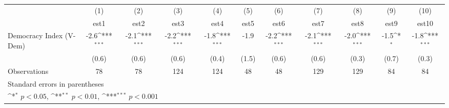 {
\def\sym#1{\ifmmode^{#1}\else\(^{#1}\)\fi}
\begin{tabular}{l*{10}{c}}
\hline\hline
                    &\multicolumn{1}{c}{(1)}         &\multicolumn{1}{c}{(2)}         &\multicolumn{1}{c}{(3)}         &\multicolumn{1}{c}{(4)}         &\multicolumn{1}{c}{(5)}         &\multicolumn{1}{c}{(6)}         &\multicolumn{1}{c}{(7)}         &\multicolumn{1}{c}{(8)}         &\multicolumn{1}{c}{(9)}         &\multicolumn{1}{c}{(10)}         \\
                    &        est1         &        est2         &        est3         &        est4         &        est5         &        est6         &        est7         &        est8         &        est9         &       est10         \\
\hline
Democracy Index (V-Dem)&        -2.6\sym{***}&        -2.1\sym{***}&        -2.2\sym{***}&        -1.8\sym{***}&        -1.9         &        -2.2\sym{***}&        -2.1\sym{***}&        -2.0\sym{***}&        -1.5\sym{*}  &        -1.8\sym{***}\\
                    &       (0.6)         &       (0.6)         &       (0.6)         &       (0.4)         &       (1.5)         &       (0.6)         &       (0.6)         &       (0.3)         &       (0.7)         &       (0.3)         \\
\hline
Observations        &          78         &          78         &         124         &         124         &          48         &          48         &         129         &         129         &          84         &          84         \\
\hline\hline
\multicolumn{11}{l}{\footnotesize Standard errors in parentheses}\\
\multicolumn{11}{l}{\footnotesize \sym{*} \(p<0.05\), \sym{**} \(p<0.01\), \sym{***} \(p<0.001\)}\\
\end{tabular}
}
